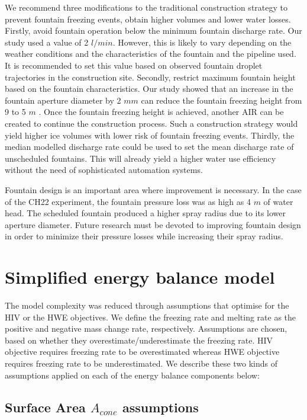 \documentclass[tc, manuscript]{copernicus}
\begin{document}
We recommend three modifications to the traditional construction strategy to prevent fountain freezing events,
obtain higher volumes and lower water losses. Firstly, avoid fountain operation below the minimum fountain
discharge rate. Our study used a value of 2 $l/min$. However, this is likely to vary depending on the weather
conditions and the characteristics of the fountain and the pipeline used. It is recommended to set this value
based on observed fountain droplet trajectories in the construction site. Secondly, restrict maximum fountain
height based on the fountain characteristics. Our study showed that an increase in the fountain aperture
diameter by 2 $mm$ can reduce the fountain freezing height from 9 to 5 $m$ . Once the fountain freezing height
is achieved, another AIR can be created to continue the construction process. Such a construction strategy would
yield higher ice volumes with lower risk of fountain freezing events. Thirdly, the median modelled discharge
rate could be used to set the mean discharge rate of unscheduled fountains. This will already yield a higher
water use efficiency without the need of sophisticated automation systems.

Fountain design is an important area where improvement is necessary. In the case of the CH22 experiment, the
fountain pressure loss was as high as 4 $m$ of water head. The scheduled fountain produced a higher spray radius
due to its lower aperture diameter. Future research must be devoted to improving fountain design in order to
minimize their pressure losses while increasing their spray radius. 


\appendix

\section{Simplified energy balance model}\label{sec:SEB}

The model complexity was reduced through assumptions that optimise for the HIV or the HWE objectives. We define the freezing rate and melting rate as the positive and negative mass change
rate, respectively. Assumptions are chosen, based on whether they overestimate/underestimate the freezing rate.
HIV objective requires freezing rate to be overestimated whereas HWE objective requires freezing rate to
be underestimated. We describe these two kinds of assumptions applied on each of the energy balance components
below: 

\subsection{Surface Area $A_{cone}$ assumptions}
\end{document}
